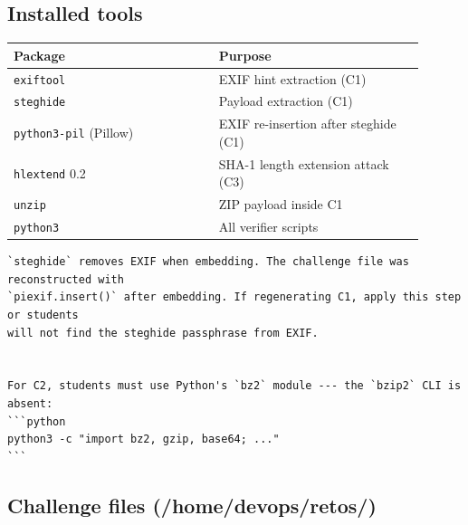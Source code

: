 \subsection{Installed tools}

{\footnotesize\begin{longtable}[]{@{}>{\raggedright\arraybackslash}p{0.45\linewidth}
  >{\raggedright\arraybackslash}p{0.45\linewidth}@{}}
\toprule\noalign{}
Package & Purpose \\
\midrule\noalign{}
\endhead
\bottomrule\noalign{}
\endlastfoot
\texttt{exiftool} & EXIF hint extraction (C1) \\
\texttt{steghide} & Payload extraction (C1) \\
\texttt{python3-pil} (Pillow) & EXIF re-insertion after steghide (C1) \\
\texttt{hlextend} 0.2 & SHA-1 length extension attack (C3) \\
\texttt{unzip} & ZIP payload inside C1 \\
\texttt{python3} & All verifier scripts \\
\end{longtable}}

\begin{lstlisting}
`steghide` removes EXIF when embedding. The challenge file was reconstructed with
`piexif.insert()` after embedding. If regenerating C1, apply this step or students
will not find the steghide passphrase from EXIF.


For C2, students must use Python's `bz2` module --- the `bzip2` CLI is absent:
```python
python3 -c "import bz2, gzip, base64; ..."
```
\end{lstlisting}

\subsection{\texorpdfstring{Challenge files ({\ttfamily /home/devops/retos/})}{Challenge files (/home/devops/retos/)}}

